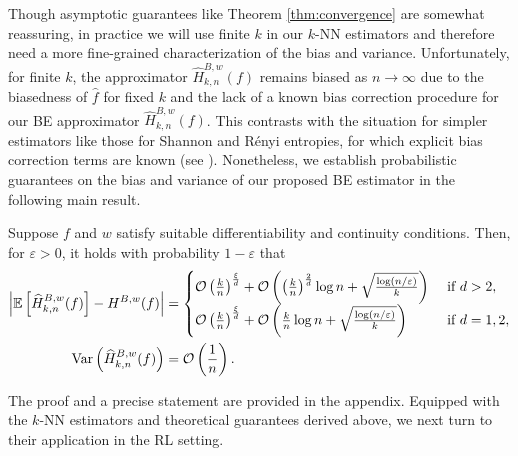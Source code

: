 Though asymptotic guarantees like Theorem \ref{thm:convergence} are somewhat reassuring, in practice we will use finite $k$ in our $k$-NN estimators and therefore need a more fine-grained characterization of the bias and variance.
%
Unfortunately, for finite $k$, the approximator $\widehat{H}^{B,w}_{k,n}(f)$ remains biased as $n \rightarrow \infty$ due to the biasedness of $\hat{f}$ for fixed $k$ and the lack of a known bias correction procedure for our BE approximator $\widehat{H}^{B,w}_{k,n}(f)$. This contrasts with the situation for simpler estimators like those for Shannon and R\'{e}nyi entropies, for which explicit bias correction terms are known (see \cite{singh2003nearest, leonenko2008class, singh2016finite}). Nonetheless, we establish probabilistic guarantees on the bias and variance of our proposed BE estimator in the following main result.
%
\begin{theorem} \label{thm:main_bound}
    Suppose $f$ and $w$ satisfy suitable differentiability and continuity conditions. Then, for $\varepsilon > 0$, it holds with probability $1 - \varepsilon$ that
    \begin{align} \left| \mathbb{E} \left[ \widehat{H}^{B,w}_{k,n}(f) \right] - H^{B,w}(f) \right| &= 
        \begin{cases}
            \mathcal{O}\left( \frac{k}{n} \right)^{\frac{\xi}{d}} + \mathcal{O}\left( \left( \frac{k}{n} \right)^{\frac{2}{d}} \log n + \sqrt{ \frac{ \log ( n / \varepsilon ) }{k} } \right) & \text{ if } d > 2, \\
            \mathcal{O}\left( \frac{k}{n} \right)^{\frac{\xi}{d}} + \mathcal{O}\left( \frac{k}{n} \log n + \sqrt{ \frac{ \log ( n / \varepsilon ) }{k} } \right) & \text{ if } d = 1, 2,
        \end{cases}
        \\
        \text{Var} \left( \widehat{H}^{B,w}_{k,n}(f) \right) &= \mathcal{O}\left( \frac{1}{n} \right).
    \end{align}
\end{theorem}
%
The proof and a precise statement are provided in the appendix. Equipped with the $k$-NN estimators and theoretical guarantees derived above, we next turn to their application in the RL setting.